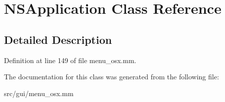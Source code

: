 \hypertarget{classNSApplication}{\section{N\-S\-Application Class Reference}
\label{classNSApplication}
}


\subsection{Detailed Description}


Definition at line 149 of file menu\-\_\-osx.\-mm.



The documentation for this class was generated from the following file\-:\begin{DoxyCompactItemize}
\item 
src/gui/menu\-\_\-osx.\-mm\end{DoxyCompactItemize}
